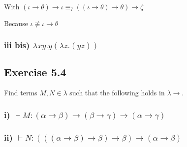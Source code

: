\documentclass[11pt]{article}
\begin{document}
With $(\iota \rightarrow \theta) \rightarrow \iota \equiv _? ((\iota \rightarrow \theta) \rightarrow \theta) \rightarrow \zeta$

Because $\iota \not \equiv \iota \rightarrow \theta$


\subsubsection*{iii bis) $\lambda xy. y(\lambda z.(yz))$}
\begin{center}




\DP
\end{center}

\subsection*{Exercise 5.4}
Find terms $M,N \in \lambda$ such that the following holds in $\lambda \rightarrow$.
\subsubsection*{i) $\vdash M : (\alpha \rightarrow \beta) \rightarrow (\beta \rightarrow \gamma) \rightarrow (\alpha \rightarrow \gamma)$}

\begin{center}


\DP
\end{center}
 
\subsubsection*{ii) $\vdash N : (((\alpha \rightarrow \beta) \rightarrow \beta) \rightarrow \beta) \rightarrow (\alpha \rightarrow \beta)$}
\end{document}
